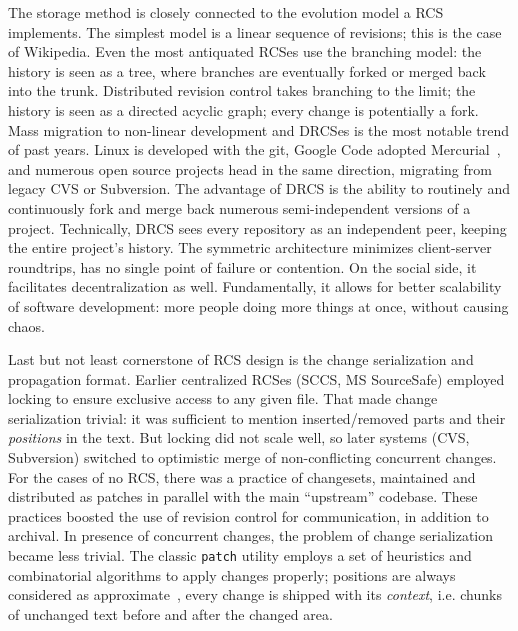 \documentclass{sig-alternate}
\begin{document}
The storage method is closely connected to the evolution model a RCS implements.
The simplest model is a linear sequence of revisions; this is the case of Wikipedia.
Even the most antiquated RCSes use the branching model: the history is seen as a tree, where branches are eventually forked or merged back into the trunk.
Distributed revision control takes branching to the limit; the history is seen as a directed acyclic graph; every change is potentially a fork.
Mass migration to non-linear development and DRCSes is the most notable trend of past years.
Linux is developed with the git, Google Code adopted Mercurial~\cite{mercurial}, and numerous open source projects head in the same direction, migrating from legacy CVS or Subversion.
The advantage of DRCS is the ability to routinely and continuously fork and merge back numerous semi-independent versions of a project.
Technically, DRCS sees every repository as an independent peer, keeping the entire project's history. The symmetric architecture minimizes client-server roundtrips, has no single point of failure or contention.
On the social side, it facilitates decentralization as well.
Fundamentally, it allows for better scalability of software development: more people doing more things at once, without causing chaos.

Last but not least cornerstone of RCS design is the change serialization and propagation format.
Earlier centralized RCSes (SCCS, MS SourceSafe) employed locking to ensure exclusive access to any given file.
That made change serialization trivial: it was sufficient to mention inserted/removed parts and their \emph{positions} in the text.
But locking did not scale well, so later systems (CVS, Subversion) switched to optimistic merge of non-conflicting concurrent changes.
For the cases of no RCS, there was a practice of changesets, maintained and distributed as patches \cite{stdpatch} in parallel with the main ``upstream'' codebase.
These practices boosted the use of revision control for communication, in addition to archival. 
In presence of concurrent changes, the problem of change serialization became less trivial.
The classic \verb+patch+ utility employs a set of heuristics and combinatorial algorithms to apply changes properly; positions are always considered as approximate~\cite{patch,fraser}, every change is shipped with its \emph{context}, i.e. chunks of unchanged text before and after the changed area.
\end{document}
